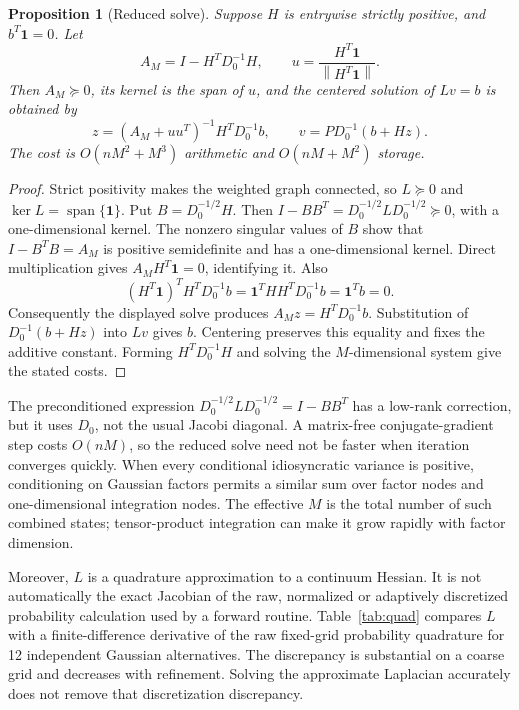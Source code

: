 \documentclass[11pt]{amsart}
\newtheorem{proposition}[theorem]{Proposition}
\theoremstyle{definition}\newtheorem{example}[theorem]{Example}
\theoremstyle{remark}\newtheorem{remark}[theorem]{Remark}
\newcommand{\one}{\mathbf 1}\newcommand{\diag}{\operatorname{diag}}
\newcommand{\norm}[1]{\left\lVert#1\right\rVert}
\begin{document}
\begin{proposition}[Reduced solve]\label{prop:reduced}
Suppose $H$ is entrywise strictly positive, and $b^T\one=0$. Let
\[
 A_M=I-H^TD_0^{-1}H,\qquad
 u=\frac{H^T\one}{\norm{H^T\one}}.
\]
Then $A_M\succeq0$, its kernel is the span of $u$, and the centered solution of $Lv=b$ is obtained by
\begin{equation}\label{eq:reduced}
 z=(A_M+uu^T)^{-1}H^TD_0^{-1}b,\qquad
 v=P D_0^{-1}(b+Hz).
\end{equation}
The cost is $O(nM^2+M^3)$ arithmetic and $O(nM+M^2)$ storage.
\end{proposition}
\begin{proof}
Strict positivity makes the weighted graph connected, so $L\succeq0$ and $\ker L=\operatorname{span}\{\one\}$. Put $B=D_0^{-1/2}H$. Then $I-BB^T=D_0^{-1/2}LD_0^{-1/2}\succeq0$, with a one-dimensional kernel. The nonzero singular values of $B$ show that $I-B^TB=A_M$ is positive semidefinite and has a one-dimensional kernel. Direct multiplication gives $A_MH^T\one=0$, identifying it. Also
\[
 (H^T\one)^TH^TD_0^{-1}b
 =\one^THH^TD_0^{-1}b=\one^Tb=0.
\]
Consequently the displayed solve produces $A_Mz=H^TD_0^{-1}b$. Substitution of $D_0^{-1}(b+Hz)$ into $Lv$ gives $b$. Centering preserves this equality and fixes the additive constant. Forming $H^TD_0^{-1}H$ and solving the $M$-dimensional system give the stated costs.
\end{proof}

The preconditioned expression $D_0^{-1/2}LD_0^{-1/2}=I-BB^T$ has a low-rank correction, but it uses $D_0$, not the usual Jacobi diagonal. A matrix-free conjugate-gradient step costs $O(nM)$, so the reduced solve need not be faster when iteration converges quickly. When every conditional idiosyncratic variance is positive, conditioning on Gaussian factors permits a similar sum over factor nodes and one-dimensional integration nodes. The effective $M$ is the total number of such combined states; tensor-product integration can make it grow rapidly with factor dimension.

Moreover, $L$ is a quadrature approximation to a continuum Hessian. It is not automatically the exact Jacobian of the raw, normalized or adaptively discretized probability calculation used by a forward routine. Table~\ref{tab:quad} compares $L$ with a finite-difference derivative of the raw fixed-grid probability quadrature for 12 independent Gaussian alternatives. The discrepancy is substantial on a coarse grid and decreases with refinement. Solving the approximate Laplacian accurately does not remove that discretization discrepancy.
\begin{table}[htbp]\centering\small

\caption{Gauss--Legendre quadrature on $[-9,9]$ for 12 independent Gaussian utilities. Derivative discrepancy and solve residual are relative Euclidean or Frobenius errors as appropriate. The raw probability quadrature is not normalized.}\label{tab:quad}
\end{table}
\end{document}
